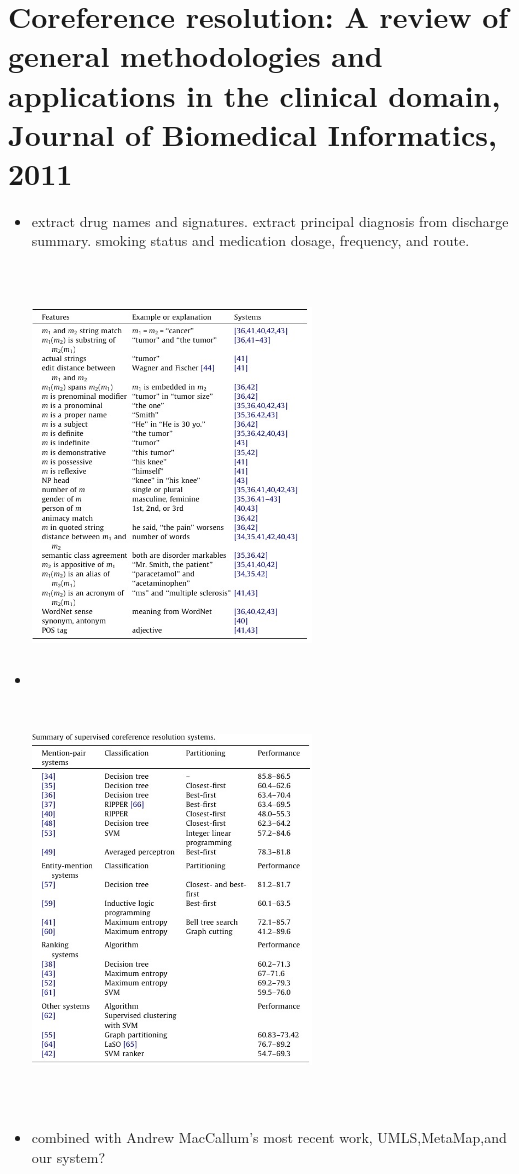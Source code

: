 \documentclass[pdftext,twoside,11pt]{article}
\begin{document}
\section{Coreference resolution: A review of general methodologies and applications
in the clinical domain, Journal of Biomedical Informatics, 2011}
\label{sec:intro} 
\begin{itemize}
\item  extract drug names and signatures. extract principal diagnosis from discharge summary.
       smoking status and medication dosage, frequency, and route.
\item
\begin{center}
      \includegraphics[height=30em,width=20em]{feature.jpg}
      \includegraphics[height=30em,width=20em]{comparision.jpg}
\end{center}

\item   combined with Andrew MacCallum's most recent work, UMLS,MetaMap,and our system? 

\end{itemize}
\end{document}
